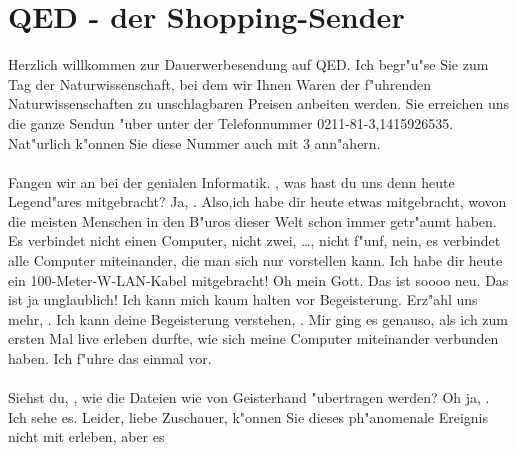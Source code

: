 \newpage
\section{QED - der Shopping-Sender}
\label{sec:QED}
\charaktere{\QEDHost, \QEDGuestA, \QEDGuestB \QEDGuestC}
\hauptbeamer{-}
\sound{-}
\begin{verseplay}[7em]
\s{\QEDHost} Herzlich willkommen zur Dauerwerbesendung auf QED. Ich begr"u"se 
                Sie zum Tag der Naturwissenschaft, bei dem wir Ihnen Waren der
                f"uhrenden Naturwissenschaften zu unschlagbaren Preisen anbeiten 
                werden. Sie erreichen uns die ganze Sendun "uber unter der 
                Telefonnummer 0211-81-3,1415926535. Nat"urlich k"onnen Sie diese 
                Nummer auch mit 3 ann"ahern.\\
                \\
                Fangen wir an bei der genialen Informatik. \QEDGuestA, was hast
                du uns denn heute Legend"ares mitgebracht?
\s{\QEDGuestA} Ja, \QEDHost. Also,ich habe dir heute etwas mitgebracht, 
                wovon die meisten Menschen in den B"uros dieser Welt schon immer 
                getr"aumt haben. Es verbindet nicht einen Computer, nicht zwei, 
                \dots, nicht f"unf, nein, es verbindet alle Computer miteinander, 
                die man sich nur vorstellen kann. Ich habe dir heute ein 
                100-Meter-W-LAN-Kabel mitgebracht!
\s{\QEDHost} Oh mein Gott. Das ist soooo neu. Das ist ja unglaublich! Ich 
                kann mich kaum halten vor Begeisterung. Erz"ahl uns mehr, \QEDGuestA.
\s{\QEDGuestA} Ich kann deine Begeisterung verstehen, \QEDHost. Mir ging es 
                genauso, als ich zum ersten Mal live erleben durfte, wie sich 
                meine Computer miteinander verbunden haben. Ich f"uhre das einmal 
                vor.\\
                \\
                Siehst du, \QEDHost, wie die Dateien wie von Geisterhand 
                "ubertragen werden?
\s{\QEDHost} Oh ja, \QEDGuestA. Ich sehe es. Leider, liebe Zuschauer, 
                k"onnen Sie dieses ph"anomenale Ereignis nicht mit erleben, aber es 

\end{verseplay}
